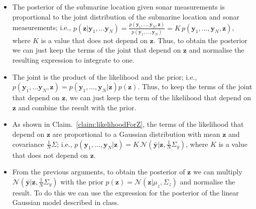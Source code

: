 \documentclass[12pt]{article}
\begin{document}
\begin{enumerate}[(a)]
        \begin{itemize}

            \item The posterior of the submarine location given sonar
                measurements is proportional to the joint distribution of
                the submarine location and sonar measurements; i.e.,
                $p(\mathbf{z}|\mathbf{y}_1,\ldots\mathbf{y}_N)=\frac{p(\mathbf{y}_1,\ldots,\mathbf{y}_N,\mathbf{z})}{p(\mathbf{y}_1,\ldots,\mathbf{y}_N)}=K\,p(\mathbf{y}_1,\ldots,\mathbf{y}_N,\mathbf{z})$,
                where $K$ is a value that does not depend on $\mathbf{z}$. Thus, to
                obtain the posterior we can just keep the terms of the
                joint that depend on $\mathbf{z}$ and normalise the
                resulting expression to integrate to one.

            \item The joint is the product of the likelihood and the prior;
                i.e.,
                $p(\mathbf{y}_1,\ldots\mathbf{y}_N,\mathbf{z})=p(\mathbf{y}_1,\ldots,\mathbf{y}_N|\mathbf{z})p(\mathbf{z})$.
                Thus, to keep the terms of the joint that depend on
                $\mathbf{z}$, we can just keep the term of the
                likelihood that depend on $\mathbf{z}$ and combine the
                result with the prior.

            \item As shown in Claim.~\ref{claim:likelihoodForZ}, the terms of the
                likelihood that depend on $\mathbf{z}$ are proportional to
                a Gaussian distribution with mean $\mathbf{z}$ and
                covariance $\frac{1}{N}\Sigma$; i.e., 
                $p(\mathbf{y}_1,\ldots,\mathbf{y}_N|\mathbf{z})=K\,\mathcal{N}(\bar{\mathbf{y}}|\mathbf{z},\frac{1}{N}\Sigma_y)$,
                where $K$ is a value that does not depend on $\mathbf{z}$.

            \item From the previous arguments, to obtain the posterior of
                $\mathbf{z}$ we can multiply
                $\mathcal{N}(\bar{\mathbf{y}}|\mathbf{z},\frac{1}{N}\Sigma_y)$
                with the prior
                $p(\mathbf{z})=\mathcal{N}(\mathbf{z}|\mu_z,\Sigma_z)$ and
                normalise the result. To do this we can use the expression
                for the posterior of the linear Gaussian model described in
                class.

        \end{itemize}


\end{enumerate}
\end{document}

